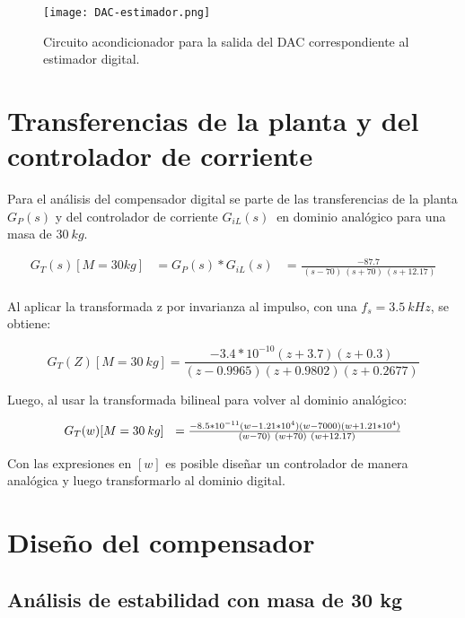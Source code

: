 \begin{figure}[H]
	\centering
	\texttt{[image: DAC-estimador.png]}
	\caption{Circuito acondicionador para la salida del DAC correspondiente al estimador digital.}
	\label{fig:DAC-estimador}
\end{figure}

\section{Transferencias de la planta y del controlador de corriente}

\noindent Para el an\'{a}lisis del compensador digital se parte de las transferencias de la planta $G_P(s)$ y del controlador de corriente $G_{iL}(s)\ $ en dominio anal\'{o}gico para una masa de $30 \:kg$.

\begin{equation} 
	\begin{aligned}
	G_T(s)[M=30kg]&=G_P(s)*G_{iL}(s)&=\frac{-87.7}{\ (s-70)\ (s+70)\ (s+12.17)}\\
	\end{aligned}
\end{equation}

\noindent Al aplicar la transformada z por invarianza al impulso, con una $f_s=3.5\:kHz$, se obtiene:

\begin{equation} 
	G_T(Z)[M=30\:kg] =\frac{-3.4*10^{-10}(z+3.7)(z+0.3)}{(z-0.9965)(z+0.9802) (z+0.2677)}
\end{equation}

\noindent Luego, al usar la transformada bilineal para volver al dominio anal\'{o}gico:

\begin{equation}
	\resizebox{.8\hsize}{!}
	{
	$G_T(w)[M=30\:kg]\ \ =\frac{-8.5*10^{-11}(w-1.21*10^4)(w-7000)(w+1.21*10^4)}{\ (w-70)\ (w+70)\ (w+12.17)}$
	}
\end{equation}


\noindent Con las expresiones en $[w]$ es posible diseñar un controlador de manera anal\'{o}gica y luego transformarlo al dominio digital.


\section{Diseño del compensador}

\subsection{Análisis de estabilidad con masa de 30 kg}

